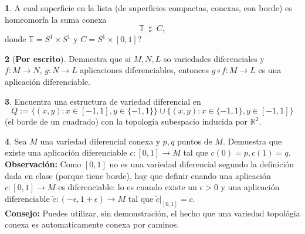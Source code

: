 \documentclass[12pt,a4paper]{report}
\theoremstyle{definition}
\newtheorem{ex}{}
\newcommand{\RR}{\ensuremath{\mathbb R}}
\newcommand{\TT}{\ensuremath{\mathbb T}}
\begin{document}
\begin{ex}  
A cual superficie en la lista (de superficies compactas, conexas, con borde) es homeomorfa la suma conexa
$$\TT \;\;\sharp\;\; C,$$
donde $\TT=S^1\times S^1$ y $C=S^1\times [0,1]$?
\end{ex} 
 

\begin{ex}[{\bf Por escrito}]
Demuestra que si $M,N,L$ so variedades diferenciales y $f \colon M \to N$, $g \colon N \to L$ aplicaciones diferenciables, entonces $g \circ f \colon M \to L$ es  una aplicaci\'on diferenciable.
\end{ex} 
 



\begin{ex}
Encuentra una estructura de variedad diferencial en $$Q:=\{(x,y):x\in[-1,1], y\in\{-1,1\}\}\cup \{(x,y): x\in\{-1,1\},y\in[-1,1]\}$$
(el borde de un cuadrado) con la topolog\'ia subespacio inducida por $\RR^2$.
\end{ex} 


\begin{ex} Sea $M$ una variedad diferencial conexa y $p,q$ puntos de $M$. Demuestra que  existe una aplicaci\'on diferenciable $c \colon [0,1] \to M$ tal que $c(0)=p,c(1)=q$.\\
{\bf Observaci\'on:} Como $[0,1]$ no es una variedad diferencial segundo la definici\'on dada  en clase (porque tiene borde), hay que definir cuando una aplicaci\'on  $c \colon [0,1] \to M$ es diferenciable: lo es cuando existe un $\epsilon >0$ y una aplicaci\'on diferenciable $\tilde{c} \colon (-\epsilon, 1+\epsilon) \to M$ tal que 
$\tilde{c}|_{[0,1]}=c$.\\
{\bf Consejo:} Puedes utilizar, sin demonstraci\'on, el hecho que una variedad topol\'ogia conexa es automaticamente conexa por caminos.
 \end{ex} 
 



 
\end{document}
